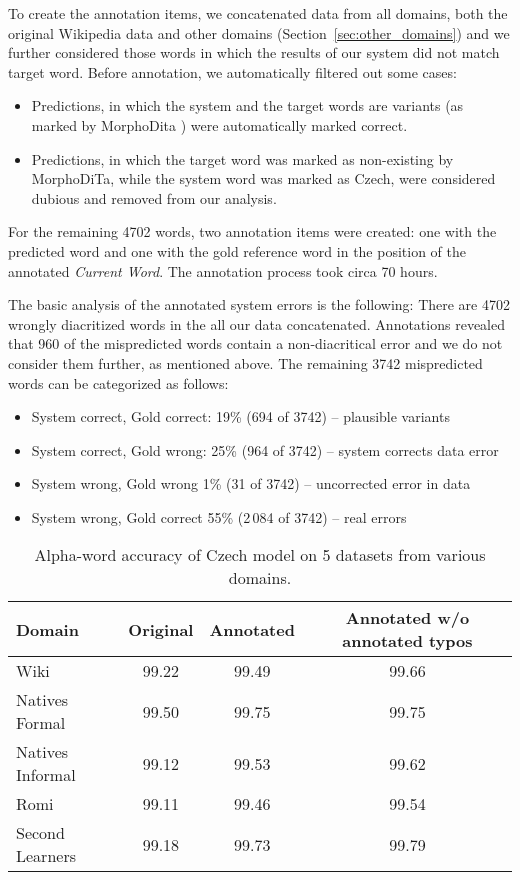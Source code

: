 \documentclass{pbmlarxiv}
\begin{document}
To create the annotation items, we concatenated data from all domains, both the original Wikipedia data \cite{naplava2018diacritics} and other domains (Section~\ref{sec:other_domains}) and we further considered those words in which the results of our system did not match target word. Before annotation, we automatically filtered out some cases:

\begin{itemize}
    \item Predictions, in which the system and the target words are variants (as marked by MorphoDita \cite{MorphoDiTa}) were automatically marked correct.
    \item Predictions, in which the target word was marked as non-existing by MorphoDiTa, while the system word was marked as Czech, were considered dubious and removed from our analysis.
\end{itemize}

For the remaining 4702 words, two annotation items were created: one with the predicted word and one with the gold reference word in the position of the annotated \textit{Current Word}. The annotation process took circa 70 hours.

The basic analysis of the annotated system errors is the following: There are 4702 wrongly diacritized words in the all our data concatenated. Annotations revealed that 960 of the mispredicted words contain a non-diacritical error and we do not consider them further, as mentioned above. The remaining 3742 mispredicted words can be categorized as follows:

\begin{itemize}
    \item System correct, Gold correct: 19\% (694 of 3742) -- plausible variants
    \item System correct, Gold wrong: 25\% (964 of 3742) -- system corrects data error
    \item System wrong, Gold wrong 1\% (31 of 3742) -- uncorrected error in data
    \item System wrong, Gold correct 55\% (2\,084 of 3742) -- real errors
\end{itemize}

\begin{table}[t]
    \centering
    \begin{tabular}{lccc}\toprule
    Domain  & Original & Annotated & Annotated w/o annotated typos \\\midrule
    Wiki & 99.22 & 99.49 & 99.66 \\ Natives Formal & 99.50 & 99.75 & 99.75 \\ Natives Informal & 99.12 & 99.53 & 99.62 \\ Romi & 99.11 & 99.46 & 99.54 \\ Second Learners & 99.18 & 99.73 & 99.79 \\\bottomrule \end{tabular}
    \caption{Alpha-word accuracy of Czech model on 5 datasets from various domains.}
    \label{table:other_domain_results}
\end{table}
\end{document}
